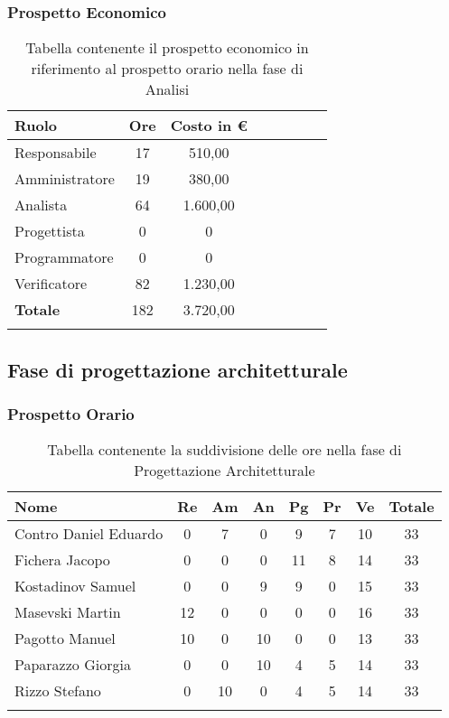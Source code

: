 \documentclass[../piano_di_progetto.tex]{subfiles}
\begin{document}
\subsubsection{Prospetto Economico}


\begin{longtable}{|l|c|c|c|c|c|c|c|}
	\hline
	\rowcolor{lightgray}
	\textbf{Ruolo} & \textbf{Ore} & \textbf{Costo in €}\\
	\endhead
	\hline
	Responsabile & 17 & 510,00 \\
	\hline
	Amministratore & 19 & 380,00 \\
	\hline
	Analista & 64 & 1.600,00 \\
	\hline
	Progettista & 0 & 0 \\
	\hline
	Programmatore & 0 & 0 \\
	\hline
	Verificatore & 82 & 1.230,00 \\
	\hline
	\textbf{Totale} & 182 & 3.720,00 \\
	\hline
	\caption{Tabella contenente il prospetto economico in riferimento al prospetto orario nella fase di Analisi} 
\end{longtable}


\subsection{ Fase di progettazione architetturale}%
\label{sub:fase_prog_arc}
\subsubsection{Prospetto Orario}

\begin{center}
	\begin{longtable}{|l|c|c|c|c|c|c|c|}
		\hline
		\rowcolor{lightgray}
		\textbf{Nome} & \textbf{Re} & \textbf{Am} & \textbf{An} & \textbf{Pg}  & \textbf{Pr}   & \textbf{Ve} & \textbf{Totale} \\

		\hline
			Contro Daniel Eduardo & 0 & 7 & 0 & 9 & 7 & 10 & 33 \\
		\hline
			Fichera Jacopo & 0 & 0 & 0 & 11 & 8 & 14 & 33 \\
		\hline
			Kostadinov Samuel & 0 & 0 & 9 & 9 & 0 & 15 & 33 \\			
		\hline
			Masevski Martin 	& 12 & 0 & 0 & 0 & 0 & 16 & 33\\
		\hline
			Pagotto Manuel & 10 & 0 & 10 & 0 & 0 & 13 & 33 \\			
		\hline
			Paparazzo Giorgia & 0 & 0 & 10 & 4 & 5 & 14 & 33 \\
		\hline
			Rizzo Stefano & 0 & 10 & 0 & 4 & 5 & 14 & 33\\
		\hline	

		\caption{Tabella contenente la suddivisione delle ore nella fase di Progettazione Architetturale}
	\end{longtable}
\end{center}
\end{document}
